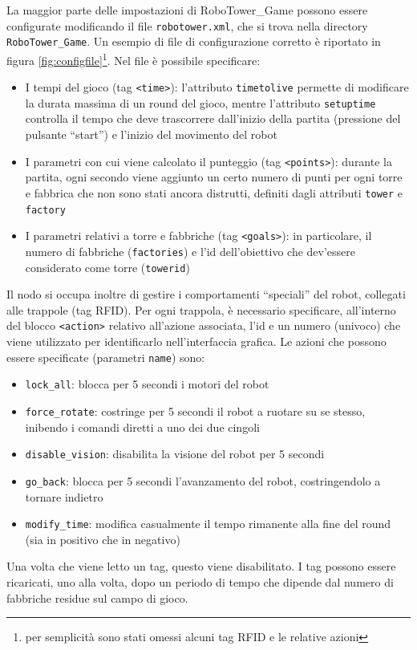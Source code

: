 La maggior parte delle impostazioni di RoboTower\_Game possono essere configurate modificando il file \verb|robotower.xml|, che si trova nella directory \verb|RoboTower_Game|. Un esempio di file di configurazione corretto è riportato in figura \ref{fig:configfile}\footnote{per semplicità sono stati omessi alcuni tag RFID e le relative azioni}. Nel file è possibile specificare:
\begin{itemize}
\item I tempi del gioco (tag \lstinline|<time>|): l'attributo \lstinline|timetolive| permette di modificare la durata massima di un round del gioco, mentre l'attributo \lstinline|setuptime| controlla il tempo che deve trascorrere dall'inizio della partita (pressione del pulsante ``start'') e l'inizio del movimento del robot
\item I parametri con cui viene calcolato il punteggio (tag \lstinline|<points>|): durante la partita, ogni secondo viene aggiunto un certo numero di punti per ogni torre e fabbrica che non sono stati ancora distrutti, definiti dagli attributi \lstinline|tower| e \lstinline|factory|
\item I parametri relativi a torre e fabbriche (tag \lstinline|<goals>|): in particolare, il numero di fabbriche (\lstinline|factories|) e l'id dell'obiettivo che dev'essere considerato come torre (\lstinline|towerid|)
\end{itemize}
Il nodo si occupa inoltre di gestire i comportamenti ``speciali'' del robot, collegati alle trappole (tag RFID). Per ogni trappola, è necessario specificare, all'interno del blocco \lstinline|<action>| relativo all'azione associata, l'id e un numero (univoco) che viene utilizzato per identificarlo nell'interfaccia grafica. Le azioni che possono essere specificate (parametri \lstinline|name|) sono:
\begin{itemize}
\item \lstinline|lock_all|: blocca per 5 secondi i motori del robot
\item \lstinline|force_rotate|: costringe per 5 secondi il robot a ruotare su se stesso, inibendo i comandi diretti a uno dei due cingoli
\item \lstinline|disable_vision|: disabilita la visione del robot per 5 secondi
\item \lstinline|go_back|: blocca per 5 secondi l'avanzamento del robot, costringendolo a tornare indietro
\item \lstinline|modify_time|: modifica casualmente il tempo rimanente alla fine del round (sia in positivo che in negativo)
\end{itemize}
Una volta che viene letto un tag, questo viene disabilitato. I tag possono essere ricaricati, uno alla volta, dopo un periodo di tempo che dipende dal numero di fabbriche residue sul campo di gioco.


